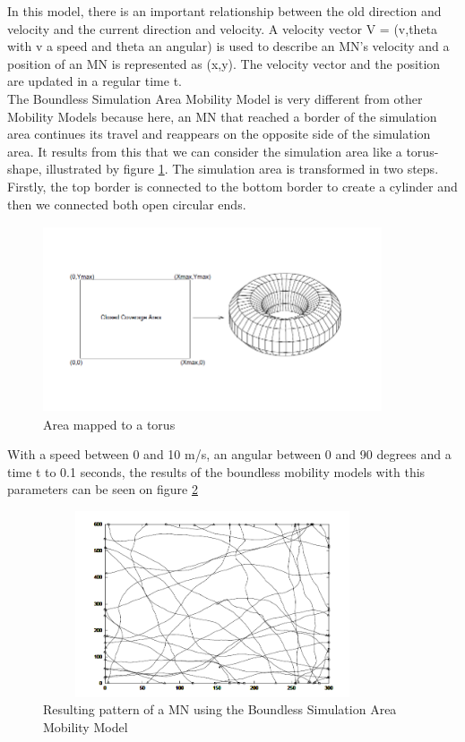 In this model, there is an important relationship between the old direction and velocity and the current direction and velocity. A velocity vector V = (v,theta with v a speed and theta an angular) is used to describe an MN's velocity and a position of an MN is represented as (x,y). The velocity vector and the position are updated in a regular time t.\\
The Boundless Simulation Area Mobility Model is very different from other Mobility Models because here, an MN that reached a border of the simulation area continues its travel and reappears on the opposite side of the simulation area. It results from this that we can consider the simulation area like a torus-shape, illustrated by figure \ref{BoundlessFig}. The simulation area is transformed in two steps. Firstly, the top border is connected to the bottom border to create a cylinder and then we connected both open circular ends.\\

\begin{figure}[h]
\center
\includegraphics[width=10cm,height=55mm]{../images/boundlessmobilitymodel1.png}
\caption{\label{BoundlessFig}Area mapped to a torus\cite{SurveyMobilityModelsAdHoc1}}
\end{figure}


With a speed between 0 and 10 m/s, an angular between 0 and 90 degrees and a time t to 0.1 seconds, the results of the boundless mobility models with this parameters can be seen on figure \ref{BoundlessFig2}\\

\begin{figure}[h]
\center
\includegraphics[width=10cm,height=55mm]{../images/boundlessmobilitymodel2.png}
\caption{\label{BoundlessFig2}Resulting pattern of a MN using the Boundless Simulation Area Mobility Model\cite{SurveyMobilityModelsAdHoc1}}
\end{figure}

